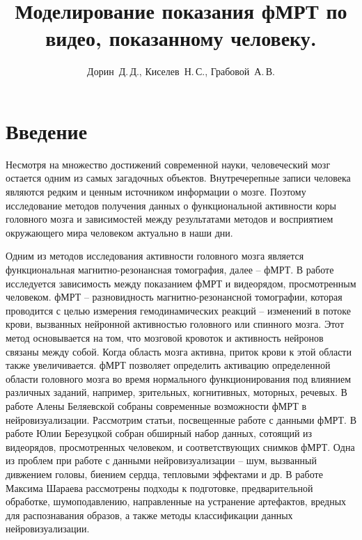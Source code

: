 \documentclass[12pt,twoside]{article}
\title
    [Моделирование показания фМРТ по видео, показанному человеку] %
    {Моделирование показания фМРТ по видео, показанному человеку.}
\author
    [Дорин~Д.\,Д.] %
    {Дорин~Д.\,Д., Киселев~Н.\,С., Грабовой~А.\,В.} %
    [Дорин~Д.\,Д.$^{1,2}$, Киселев~Н.\,С.$^{1,2}$, Грабовой~А.\,В.$^2$] %
\begin{document}
\maketitle
\section{Введение}
Несмотря на множество достижений современной науки, человеческий мозг остается одним из самых загадочных объектов. 
Внутречерепные записи человека являются редким и ценным источником информации о мозге.
Поэтому исследование методов получения данных о функциональной активности коры 
головного мозга и зависимостей между результатами методов и восприятием окружающего мира человеком актуально в наши дни.

Одним из методов исследования активности головного мозга является функциональная магнитно-резонансная томография, далее -- фМРТ.
В работе исследуется зависимость между показанием фМРТ и видеорядом, просмотренным человеком.
фМРТ -- разновидность магнитно-резонансной томографии, которая проводится с целью измерения гемодинамических реакций -- 
изменений в потоке крови, вызванных нейронной активностью головного или спинного мозга.
Этот метод основывается на том, что мозговой кровоток и активность нейронов связаны между собой. Когда область мозга активна, 
приток крови к этой области также увеличивается. 
фМРТ позволяет определить активацию определенной области головного мозга во время нормального функционирования под 
влиянием различных заданий, например, зрительных, когнитивных,  моторных,  речевых.
В работе Алены Беляевской \citep{Belyaevskaya2018} собраны современные возможности фМРТ в нейровизуализации.
Рассмотрим статьи, посвещенные работе с данными фМРТ.
В работе Юлии Березуцкой \citep{Berezutskaya2022} собран обширный набор данных, сотоящий из видеорядов, просмотренных 
человеком, и соответствующих снимков фМРТ. Одна из проблем при работе с данными нейровизуализации -- шум, вызванный 
дивжением головы, биением сердца, тепловыми эффектами и др. 
В работе Максима Шараева \citep{https://doi.org/10.48550/arxiv.1804.10167} рассмотрены подходы к подготовке,
предварительной обработке, шумоподавлению, направленные на устранение артефактов, вредных 
для распознавания образов, а также методы классификации данных нейровизуализации.
\end{document}
